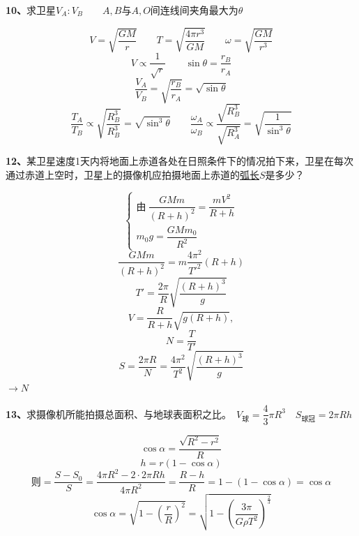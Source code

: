 \begin{problem}[10]
\textbf{10、}求卫星$V_A:V_B$　　$A,B$与$A,O$间连线间夹角最大为$\theta$
\begin{solution}
\[ V=\sqrt{\dfrac{GM}{r}}\qquad T=\sqrt{\dfrac{4\pi r^3}{GM}}\qquad \omega=\sqrt{\dfrac{GM}{r^3}} \] %
\[ V\propto\dfrac{1}{\sqrt{r}}\qquad \sin\theta=\dfrac{r_B}{r_A} \]
\[ \dfrac{V_A}{V_B}=\sqrt{\dfrac{r_B}{r_A}}=\sqrt{\sin\theta} \]
\[ \dfrac{T_A}{T_B}\propto\sqrt{\dfrac{R_B^3}{R_B^3}}=\sqrt{\sin^3\theta}\qquad \dfrac{\omega_A}{\omega_B}\propto\dfrac{\sqrt{R_B^3}}{\sqrt{R_A^3}}=\sqrt{\dfrac{1}{\sin^3\theta}} \] %
\end{solution}
\end{problem}

\begin{problem}[12]
\textbf{12、}某卫星速度1天内将地面上赤道各处在日照条件下的情况拍下来，卫星在每次通过赤道上空时，卫星上的摄像机应拍摄地面上赤道的\uline{弧长}$S$是多少？%
\begin{solution}
\[ \begin{cases}
\text{由}\ \dfrac{GMm}{(R+h)^2}=\dfrac{mV^2}{R+h}\\[4pt]
m_0g=\dfrac{GMm_0}{R^2}
\end{cases} \]
\[ \dfrac{GMm}{(R+h)^2}=m\dfrac{4\pi^2}{T'^2}(R+h) \]
\[ T'=\dfrac{2\pi}{R}\sqrt{\dfrac{(R+h)^3}{g}} \]
\[ V=\dfrac{R}{R+h}\sqrt{g(R+h)}, \]
\[ N=\dfrac{T}{T'} \]
\[ S=\dfrac{2\pi R}{N}=\dfrac{4\pi^2}{T^2}\sqrt{\dfrac{(R+h)^3}{g}} \] %
$\to N$%
\end{solution}
\end{problem}

\begin{problem}[13]
\textbf{13、}求摄像机所能拍摄总面积、与地球表面积之比。　$V_{\text{球}}=\dfrac{4}{3}\pi R^3$　$S_{\text{球冠}}=2\pi Rh$
\begin{solution}
\[ \cos\alpha=\dfrac{\sqrt{R^2-r^2}}{R} \]
\[ h=r(1-\cos\alpha) \]
\[ \text{则}=\dfrac{S-S_0}{S}=\dfrac{4\pi R^2-2\cdot2\pi Rh}{4\pi R^2}=\dfrac{R-h}{R}=1-(1-\cos\alpha)=\cos\alpha \]
\[ \cos\alpha=\sqrt{1-\left(\dfrac{r}{R}\right)^2}=\sqrt{1-\left(\dfrac{3\pi}{G\rho T^2}\right)^{\frac{2}{3}}} \]
\end{solution}
\end{problem}


